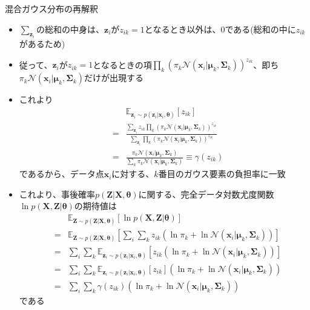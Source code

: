 \documentclass[dvipdfmx,notheorems,t]{beamer}
\begin{document}
\begin{frame}{混合ガウス分布の再解釈}
\begin{itemize}
\begin{itemize}
		\item $\displaystyle \sum_{\bm{z}_i}$の総和の中身は、$\bm{z}_i$が$z_{ik} = 1$となるとき以外は、$0$である(総和の中に$z_{ik}$があるため)
		\item 従って、$\bm{z}_i$が$z_{ik} = 1$となるときの項$\prod_k \left( \pi_k \mathcal{N}(\bm{x}_i | \bm{\mu}_k, \bm{\Sigma}_k) \right)^{z_{ik}}$、即ち$\pi_k \mathcal{N}(\bm{x}_i | \bm{\mu}_k, \bm{\Sigma}_k)$だけが出現する
		\newline
		
		\item これより
		\begin{eqnarray}
			&& \mathbb{E}_{\bm{z}_i \sim p(\bm{z}_i | \bm{x}_i, \bm{\theta})}[z_{ik}] \nonumber \\
			&=& \frac{\displaystyle \sum_{\bm{z}_i} z_{ik} \prod_k \left( \pi_k \mathcal{N}(\bm{x}_i | \bm{\mu}_k, \bm{\Sigma}_k) \right)^{z_{ik}}}{\displaystyle \sum_{\bm{z}_i} \prod_k \left( \pi_k \mathcal{N}(\bm{x}_i | \bm{\mu}_k, \bm{\Sigma}_k) \right)^{z_{ik}}} \nonumber \\
			&=& \frac{\pi_k \mathcal{N}(\bm{x}_i | \bm{\mu}_k, \bm{\Sigma}_k)}{\sum_k \pi_k \mathcal{N}(\bm{x}_i | \bm{\mu}_k, \bm{\Sigma}_k)} \equiv \gamma(z_{ik})
		\end{eqnarray}
		であるから、データ点$\bm{x}_i$に対する、$k$番目のガウス要素の\alert{負担率に一致}
		\newline
		
		\item これより、事後確率$p(\bm{Z} | \bm{X}, \bm{\theta})$に関する、完全データ対数尤度関数$\ln p(\bm{X}, \bm{Z} | \bm{\theta})$の期待値は
		\begin{eqnarray}
			&& \mathbb{E}_{\bm{Z} \sim p(\bm{Z} | \bm{X}, \bm{\theta})} \left[ \ln p(\bm{X}, \bm{Z} | \bm{\theta}) \right] \nonumber \\
			&=& \mathbb{E}_{\bm{Z} \sim p(\bm{Z} | \bm{X}, \bm{\theta})} \left[ \sum_i \sum_k z_{ik} \left( \ln \pi_k + \ln \mathcal{N}(\bm{x}_i | \bm{\mu}_k, \bm{\Sigma}_k) \right) \right] \nonumber \\
			&=& \sum_i \sum_k \mathbb{E}_{\bm{z}_i \sim p(\bm{z}_i | \bm{x}_i, \bm{\theta})} \left[ z_{ik} \left( \ln \pi_k + \ln \mathcal{N}(\bm{x}_i | \bm{\mu}_k, \bm{\Sigma}_k) \right) \right] \\
			&=& \sum_i \sum_k \mathbb{E}_{\bm{z}_i \sim p(\bm{z}_i | \bm{x}_i, \bm{\theta})} \left[ z_{ik} \right] \left( \ln \pi_k + \ln \mathcal{N}(\bm{x}_i | \bm{\mu}_k, \bm{\Sigma}_k) \right) \\
			&=& \sum_i \sum_k \gamma(z_{ik}) \left( \ln \pi_k + \ln \mathcal{N}(\bm{x}_i | \bm{\mu}_k, \bm{\Sigma}_k) \right)
		\end{eqnarray}
		である
		\newline
		

\end{itemize}
\end{itemize}
\end{frame}
\end{document}
